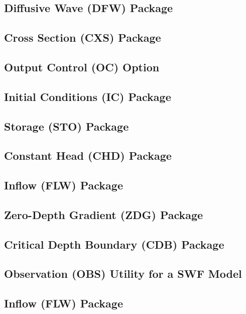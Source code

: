 \newpage
\subsection{Diffusive Wave (DFW) Package}


\newpage
\subsection{Cross Section (CXS) Package}


\newpage
\subsection{Output Control (OC) Option}


\newpage
\subsection{Initial Conditions (IC) Package}


\newpage
\subsection{Storage (STO) Package}


\newpage
\subsection{Constant Head (CHD) Package}


\newpage
\subsection{Inflow (FLW) Package}


\newpage
\subsection{Zero-Depth Gradient (ZDG) Package}


\newpage
\subsection{Critical Depth Boundary (CDB) Package}


\newpage
\subsection{Observation (OBS) Utility for a SWF Model}


\newpage
\subsection{Inflow (FLW) Package}



